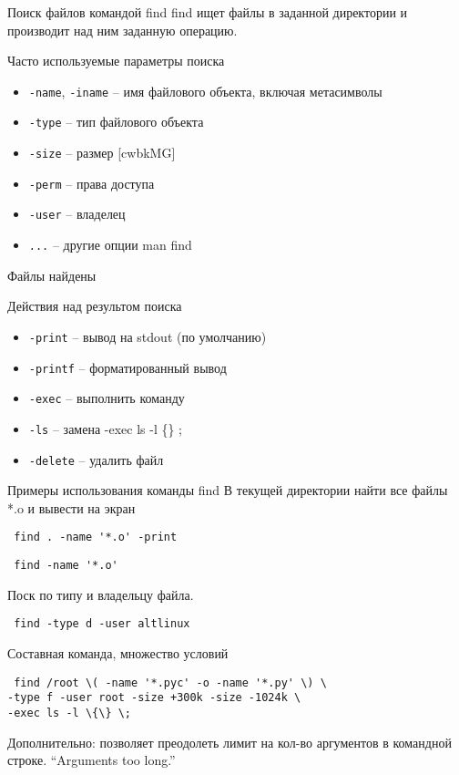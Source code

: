 \begin{frame}[fragile]{Поиск файлов командой find}
    \alert{find} ищет файлы в заданной директории и производит над ним заданную операцию.
	\begin{block}{Часто используемые параметры поиска}
		\begin{itemize}
			\item {\tt -name}, {\tt -iname} -- имя файлового объекта, включая метасимволы 
			\item {\tt -type} -- тип файлового объекта
			\item {\tt -size} -- размер [cwbkMG]
			\item {\tt -perm} -- права доступа
			\item {\tt -user} -- владелец
			\item {\tt ...} -- другие опции man find 
		\end{itemize}
	\end{block}
\end{frame}

\begin{frame}[fragile]{Файлы найдены}
	\begin{block}{Действия над результом поиска}
		\begin{itemize}
			\item {\tt -print} -- вывод на stdout (по умолчанию)
			\item {\tt -printf} -- форматированный вывод
			\item {\tt -exec} -- выполнить команду
			\item {\tt -ls} -- замена -exec ls -l \{\} ;
			\item {\tt -delete} -- удалить файл
		\end{itemize}
	\end{block}
\end{frame}

\begin{frame}[fragile]{Примеры использования команды find}
            В текущей директории найти все файлы *.o и вывести на экран 
            \begin{verbatim} find . -name '*.o' -print \end{verbatim}
            \begin{verbatim} find -name '*.o' \end{verbatim}
            Поск по типу и владельцу файла.
            \begin{verbatim} find -type d -user altlinux \end{verbatim}
            Составная команда, множество условий
            \begin{verbatim} find /root \( -name '*.pyc' -o -name '*.py' \) \
-type f -user root -size +300k -size -1024k \
-exec ls -l \{\} \; \end{verbatim}
 Дополнительно: позволяет преодолеть лимит на кол-во аргументов в командной строке. 
 \textquotedblleft Arguments too long.\textquotedblright 
\end{frame}
